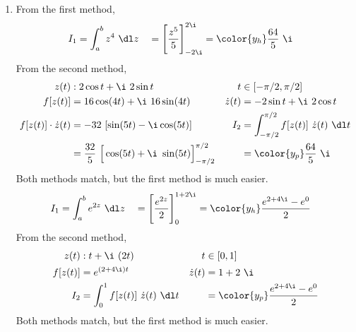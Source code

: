 \begin{enumerate}
\begin{enumerate}
              \item From the first method,
                    \begin{align}
                        I_1 & = \int_{a}^{b} z^4\ \dl z                  &
                            & = \Bigg[ \frac{z^5}{5} \Bigg]_{-2\i}^{2\i}
                        = \color{y_h} \frac{64}{5}\ \i
                    \end{align}
                    From the second method,
                    \begin{align}
                        z(t)       & : 2\cos t + \i\ 2\sin t         &
                        t          & \in [-\pi/2, \pi/2]               \\
                        f[z(t)]    & = 16 \cos(4t) + \i\ 16\sin(4t)  &
                        \dot{z}(t) & = -2\sin t + \i\ 2\cos t          \\
                        f[z(t)] \cdot
                        \dot{z}(t) & = -32\ [\sin(5t) - \i \cos(5t)] &
                        I_2        & = \int_{-\pi/2}^{\pi/2} f[z(t)]
                        \ \dot{z}(t)\ \dl t                            \\
                                   & = \frac{32}{5}\ \Big[ \cos(5t)
                            + \i\ \sin(5t)\Big]_{-\pi/2}
                        ^{\pi/2}   &
                                   & = \color{y_p} \frac{64}{5}\ \i
                    \end{align}
                    Both methods match, but the first method is much easier.
                    \begin{align}
                        I_1 & = \int_{a}^{b} e^{2z}\ \dl z                   &
                            & = \Bigg[ \frac{e^{2z}}{2} \Bigg]_{0}^{1 + 2\i}
                        = \color{y_h} \frac{e^{2 + 4\i} - e^{0}}{2}
                    \end{align}
                    From the second method,
                    \begin{align}
                        z(t)                & : t + \i\ (2t)                         &
                        t                   & \in [0, 1]                               \\
                        f[z(t)]             & = e^{(2 + 4\i)t}                       &
                        \dot{z}(t)          & = 1 + 2\ \i                              \\
                        I_2                 & = \int_{0}^{1} f[z(t)]
                        \ \dot{z}(t)\ \dl t &
                                            & = \color{y_p} \frac{e^{2 + 4\i} - e^0}
                        {2}
                    \end{align}
                    Both methods match, but the first method is much easier.


\end{enumerate}
\end{enumerate}
